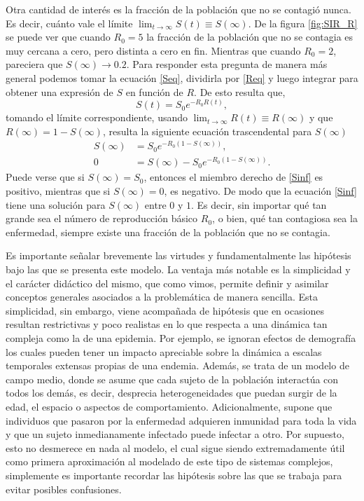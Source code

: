 Otra cantidad de interés es la fracción de la población que no se contagió nunca. Es decir, cuánto vale el límite $\lim_{t \to \infty} S(t) \equiv S(\infty)$. De la figura 
\ref{fig:SIR_R} se puede ver que cuando $R_0=5$ la fracción de la población que no se 
contagia es muy cercana a cero, pero distinta a cero en fin. Mientras que cuando $R_0 = 2$, pareciera que $S(\infty) \to 0.2$. Para responder esta pregunta de manera más 
general podemos tomar la ecuación \ref{Seq}, dividirla por \ref{Req} y luego integrar para obtener una expresión de $S$ en función de $R$. De esto resulta que,
$$S(t) = S_0 e^{-R_0R(t)},$$
tomando el límite correspondiente, usando $\lim_{t \to \infty}R(t)\equiv R(\infty)$ y que $R(\infty) = 1 - S(\infty)$, resulta la siguiente ecuación trascendental 
para $S(\infty)$
\begin{align}
  S(\infty) &= S_0 e^{-R_0 (1 - S(\infty))},\nonumber \\
  0 &= S(\infty) - S_0 e^{-R_0 \left(1 - S(\infty)\right)}.  \label{Sinf}
\end{align}
Puede verse que si $S(\infty) = S_0$, entonces el miembro derecho de \ref{Sinf} es positivo, mientras que si $S(\infty) = 0$, es negativo. De modo que la ecuación 
\ref{Sinf} tiene una solución para $S(\infty)$ entre $0$ y $1$. Es decir, sin importar qué tan grande sea el número de reproducción básico $R_0$, o bien, qué tan 
contagiosa sea la enfermedad, siempre existe una fracción de la población que no se contagia.

Es importante señalar brevemente las virtudes y fundamentalmente las hipótesis bajo las que se presenta este modelo. La ventaja más notable es la 
simplicidad y el carácter didáctico del mismo, que como vimos, permite definir y asimilar conceptos generales asociados a la problemática de manera sencilla.
Esta simplicidad, sin embargo, viene acompañada de hipótesis que en ocasiones resultan restrictivas y poco realistas en lo que respecta a una dinámica
tan compleja como la de una epidemia. Por ejemplo, se ignoran efectos de demografía los cuales
pueden tener un impacto apreciable sobre la dinámica a escalas temporales extensas propias de una endemia. Además, se trata de un modelo de campo medio, 
donde se asume que cada sujeto de la población interactúa con todos los demás, es decir, desprecia heterogeneidades que puedan surgir de la edad, el 
espacio o aspectos de comportamiento. Adicionalmente, supone que individuos que pasaron por la enfermedad adquieren inmunidad para toda la vida y que
un sujeto inmedianamente infectado puede infectar a otro. Por supuesto, esto no desmerece en nada al modelo, el cual sigue siendo extremadamente útil como primera 
aproximación al modelado de este tipo de sistemas complejos, simplemente es importante recordar las hipótesis sobre las que se trabaja para evitar posibles confusiones.

